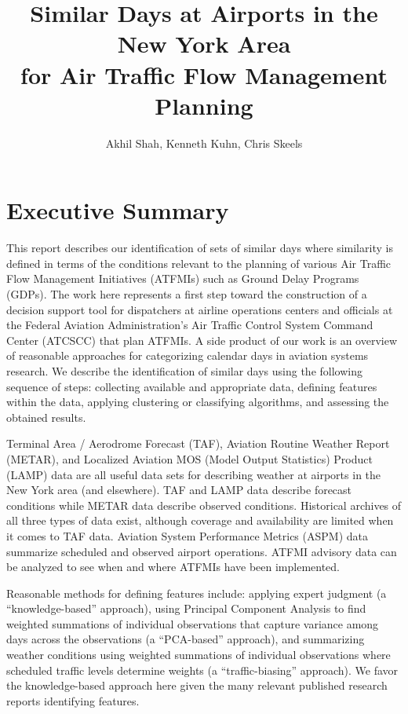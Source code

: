 \documentclass[11pt]{scrartcl}
\title{Similar Days at Airports in the New York Area\\ for Air Traffic Flow Management Planning}
\author{Akhil Shah, Kenneth Kuhn, Chris Skeels}
\begin{document}
\maketitle


\section*{Executive Summary}
This report describes our identification of sets of similar days where similarity is defined in terms of the conditions relevant to the planning of various Air Traffic Flow Management Initiatives (ATFMIs) such as Ground Delay Programs (GDPs).  The work here represents a first step toward the construction of a decision support tool for dispatchers at airline operations centers and officials at the Federal Aviation Administration's Air Traffic Control System Command Center (ATCSCC) that plan ATFMIs.  A side product of our work is an overview of reasonable approaches for categorizing calendar days in aviation systems research.  We describe the identification of similar days using the following sequence of steps: collecting available and appropriate data, defining features within the data, applying clustering or classifying algorithms, and assessing the obtained results.

Terminal Area / Aerodrome Forecast (TAF), Aviation Routine Weather Report (METAR), and Localized Aviation MOS (Model Output Statistics) Product (LAMP) data are all useful data sets for describing weather at airports in the New York area (and elsewhere).  TAF and LAMP data describe forecast conditions while METAR data describe observed conditions.  Historical archives of all three types of data exist, although coverage and availability are limited when it comes to TAF data.  Aviation System Performance Metrics (ASPM) data summarize scheduled and observed airport operations.  ATFMI advisory data can be analyzed to see when and where ATFMIs have been implemented.

Reasonable methods for defining features include: applying expert judgment (a ``knowledge-based'' approach), using Principal Component Analysis to find weighted summations of individual observations that capture variance among days across the observations (a ``PCA-based'' approach), and summarizing weather conditions using weighted summations of individual observations where scheduled traffic levels determine weights (a ``traffic-biasing'' approach).  We favor the knowledge-based approach here given the many relevant published research reports identifying features.
\end{document}
